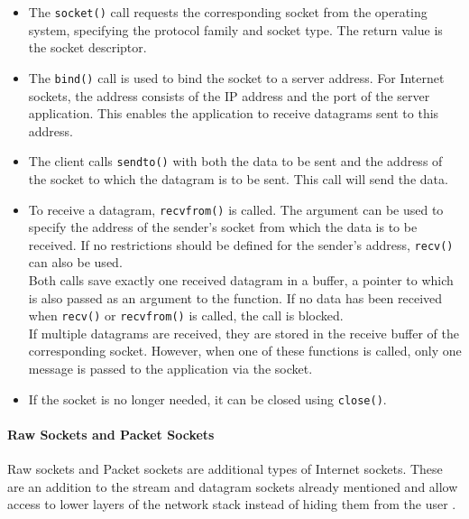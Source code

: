 \begin{itemize}
\item The \texttt{socket()} call requests the corresponding socket from the operating system, specifying the protocol family and socket type. The return value is the socket descriptor.
\item The \texttt{bind()} call is used to bind the socket to a server address. For Internet sockets, the address consists of the IP address and the port of the server application. This enables the application to receive datagrams sent to this address.
\item The client calls \texttt{sendto()} with both the data to be sent and the address of the socket to which the datagram is to be sent. This call will send the data.
\item \begin{minipage}[t]{\linewidth}
            To receive a datagram, \texttt{recvfrom()} is called. The argument can be used to specify the address of the sender's socket from which the data is to be received. If no restrictions should be defined for the sender's address, \texttt{recv()} can also be used.\\
            Both calls save exactly one received datagram in a buffer, a pointer to which is also passed as an argument to the function. If no data has been received when \texttt{recv()} or \texttt{recvfrom()} is called, the call is blocked.\\
            If multiple datagrams are received, they are stored in the receive buffer of the corresponding socket. However, when one of these functions is called, only one message is passed to the application via the socket.
      \end{minipage}
\item If the socket is no longer needed, it can be closed using \texttt{close()}.
\end{itemize}


\paragraph{Raw Sockets and Packet Sockets}

Raw sockets and Packet sockets are additional types of Internet sockets. These are an addition to the stream and datagram sockets already mentioned and allow access to lower layers of the network stack instead of hiding them from the user \cite{sock07}.

